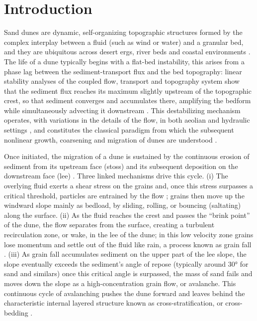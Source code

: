 \documentclass[lineno]{JFM-FLM_Au}
\begin{document}
\section{Introduction}
\label{Sec:introduction}

Sand dunes are dynamic, self-organizing topographic structures formed by the complex interplay between a fluid (such as wind or water) and a granular bed, and they are ubiquitous across desert ergs, river beds and coastal environments \citep{charru2013,vriend2026dynamics,arrospide2018,Lapotre2017}. The life of a dune typically begins with a flat-bed instability, this arises from a phase lag between the sediment-transport flux and the bed topography: linear stability analyses of the coupled flow, transport and topography system show that the sediment flux reaches its maximum slightly upstream of the topographic crest, so that sediment converges and accumulates there, amplifying the bedform while simultaneously advecting it downstream \citep{charru2013,vriend2026dynamics}. This destabilizing mechanism operates, with variations in the details of the flow, in both aeolian and hydraulic settings \citep{charru2013,Lapotre2017,raudkivi2006}, and constitutes the classical paradigm from which the subsequent nonlinear growth, coarsening and migration of dunes are understood \citep{vriend2026dynamics}.

Once initiated, the migration of a dune is sustained by the continuous erosion of sediment from its upstream face (stoss) and its subsequent deposition on the downstream face (lee) \citep{kleinhans2004_34}. Three linked mechanisms drive this cycle. (i) The overlying fluid exerts a shear stress on the grains and, once this stress surpasses a critical threshold, particles are entrained by the flow \citep{gao2016}; grains then move up the windward slope mainly as bedload, by sliding, rolling, or bouncing (saltating) along the surface. (ii) As the fluid reaches the crest and passes the ``brink point'' of the dune, the flow separates from the surface, creating a turbulent recirculation zone, or wake, in the lee of the dune; in this low velocity zone grains lose momentum and settle out of the fluid like rain, a process known as grain fall \citep{anderson1988}. (iii) As grain fall accumulates sediment on the upper part of the lee slope, the slope eventually exceeds the sediment's angle of repose (typically around $30°$ for sand and similars) once this critical angle is surpassed, the mass of sand fails and moves down the slope as a high-concentration grain flow, or avalanche. This continuous cycle of avalanching pushes the dune forward and leaves behind the characteristic internal layered structure known as cross-stratification, or cross-bedding \citep{reesink2007,reesink2009,bristow2000}.
\end{document}
